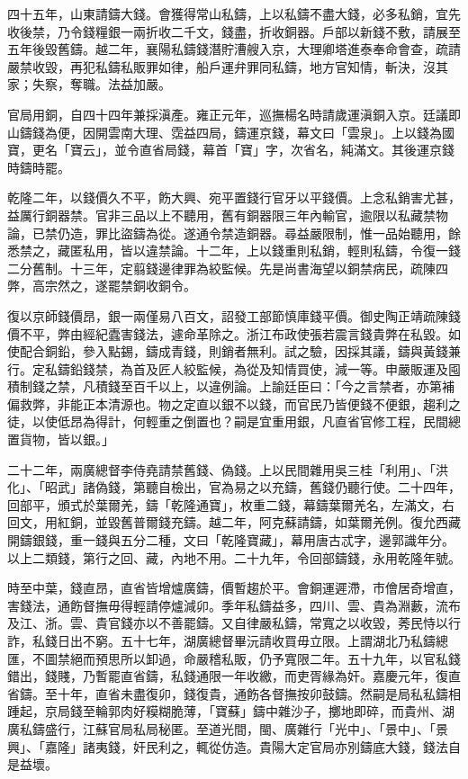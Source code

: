 \begin{pinyinscope}
四十五年，山東請鑄大錢。會獲得常山私鑄，上以私鑄不盡大錢，必多私銷，宜先收後禁，乃令錢糧銀一兩折收二千文，錢盡，折收銅器。戶部以新錢不敷，請展至五年後毀舊鑄。越二年，襄陽私鑄錢潛貯漕艘入京，大理卿塔進泰奉命會查，疏請嚴禁收毀，再犯私鑄私販罪如律，船戶運弁罪同私鑄，地方官知情，斬決，沒其家；失察，奪職。法益加嚴。

官局用銅，自四十四年兼採滇產。雍正元年，巡撫楊名時請歲運滇銅入京。廷議即山鑄錢為便，因開雲南大理、霑益四局，鑄運京錢，幕文曰「雲泉」。上以錢為國寶，更名「寶云」，並令直省局錢，幕首「寶」字，次省名，純滿文。其後運京錢時鑄時罷。

乾隆二年，以錢價久不平，飭大興、宛平置錢行官牙以平錢價。上念私銷害尤甚，益厲行銅器禁。官非三品以上不聽用，舊有銅器限三年內輸官，逾限以私藏禁物論，已禁仍造，罪比盜鑄為從。遂通令禁造銅器。尋益嚴限制，惟一品始聽用，餘悉禁之，藏匿私用，皆以違禁論。十二年，上以錢重則私銷，輕則私鑄，令復一錢二分舊制。十三年，定翦錢邊律罪為絞監候。先是尚書海望以銅禁病民，疏陳四弊，高宗然之，遂罷禁銅收銅令。

復以京師錢價昂，銀一兩僅易八百文，詔發工部節慎庫錢平價。御史陶正靖疏陳錢價不平，弊由經紀蠹害錢法，遽命革除之。浙江布政使張若震言錢貴弊在私毀。如使配合銅鉛，參入點錫，鑄成青錢，則銷者無利。試之驗，因採其議，鑄與黃錢兼行。定私鑄鉛錢禁，為首及匠人絞監候，為從及知情買使，減一等。申嚴販運及囤積制錢之禁，凡積錢至百千以上，以違例論。上諭廷臣曰：「今之言禁者，亦第補偏救弊，非能正本清源也。物之定直以銀不以錢，而官民乃皆便錢不便銀，趨利之徒，以使低昂為得計，何輕重之倒置也？嗣是宜重用銀，凡直省官修工程，民間總置貨物，皆以銀。」

二十二年，兩廣總督李侍堯請禁舊錢、偽錢。上以民間雜用吳三桂「利用」、「洪化」、「昭武」諸偽錢，第聽自檢出，官為易之以充鑄，舊錢仍聽行使。二十四年，回部平，頒式於葉爾羌，鑄「乾隆通寶」，枚重二錢，幕鑄葉爾羌名，左滿文，右回文，用紅銅，並毀舊普爾錢充鑄。越二年，阿克蘇請鑄，如葉爾羌例。復允西藏開鑄銀錢，重一錢與五分二種，文曰「乾隆寶藏」，幕用唐古忒字，邊郭識年分。以上二類錢，第行之回、藏，內地不用。二十九年，令回部鑄錢，永用乾隆年號。

時至中葉，錢直昂，直省皆增爐廣鑄，價暫趨於平。會銅運遲滯，市儈居奇增直，害錢法，通飭督撫毋得輕請停爐減卯。季年私鑄益多，四川、雲、貴為淵藪，流布及江、浙。雲、貴官錢亦以不善罷鑄。又自律嚴私鑄，常寬之以收毀，莠民恃以行詐，私錢日出不窮。五十七年，湖廣總督畢沅請收買毋立限。上謂湖北乃私鑄總匯，不圖禁絕而預思所以卸過，命嚴稽私販，仍予寬限二年。五十九年，以官私錢錯出，錢賤，乃暫罷直省鑄，私錢通限一年收繳，而吏胥緣為奸。嘉慶元年，復直省鑄。至十年，直省未盡復卯，錢復貴，通飭各督撫按卯鼓鑄。然嗣是局私私鑄相踵起，京局錢至輪郭肉好糢糊脆薄，「寶蘇」鑄中雜沙子，擲地即碎，而貴州、湖廣私鑄盛行，江蘇官局私局秘匿。至道光間，閩、廣雜行「光中」、「景中」、「景興」、「嘉隆」諸夷錢，奸民利之，輒從仿造。貴陽大定官局亦別鑄底大錢，錢法自是益壞。


\end{pinyinscope}
